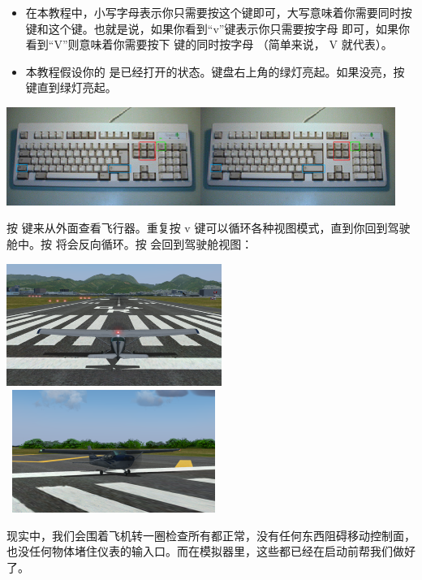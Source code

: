 \begin{itemize}
    \item 在本教程中，小写字母表示你只需要按这个键即可，大写意味着你需要同时按 \textcolor{blue}{} 键和这个键。也就是说，如果你看到“v”键表示你只需要按字母  即可，如果你看到“V”则意味着你需要按下  键的同时按字母 （简单来说， V 就代表）。
    \item 本教程假设你的  是已经打开的状态。键盘右上角的绿灯亮起。如果没亮，按\textcolor{green}{}键直到绿灯亮起。
\end{itemize}
\medskip

\centerline{
  \includegraphics[width=0.95\textwidth]{img/basic_tutorial/numlock}
}
\medskip
{}

按  键来从外面查看飞行器。重复按 v 键可以循环各种视图模式，直到你回到驾驶舱中。按  将会反向循环。按  会回到驾驶舱视图：

\medskip

\centerline{
  \includegraphics[clip,width=7.0cm,height=4.0cm]{img/basic_tutorial/extern1}
  \includegraphics[clip,width=7.0cm,height=4.0cm]{img/basic_tutorial/extern2}
}
\medskip

现实中，我们会围着飞机转一圈检查所有都正常，没有任何东西阻碍移动控制面，也没任何物体堵住仪表的输入口。而在模拟器里，这些都已经在启动前帮我们做好了。

